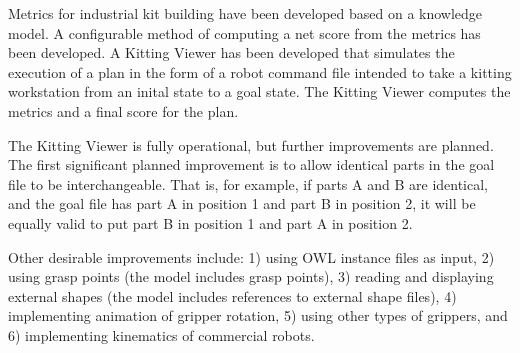 Metrics for industrial kit building have been developed based on a
knowledge model. A configurable method of computing a net score from the
metrics has been developed. A Kitting Viewer has been developed that
simulates the execution of a plan in the form of a robot command file
intended to take a kitting workstation from an inital state to a goal
state. The Kitting Viewer computes the metrics and a final score for the
plan.

The Kitting Viewer is fully operational, but further improvements are
planned. The first significant planned improvement is to allow identical
parts in the goal file to be interchangeable. That is, for example, if
parts A and B are identical, and the goal file has part A in position 1 and
part B in position 2, it will be equally valid to put part B in position 1
and part A in position 2.

Other desirable improvements include: 1) using OWL instance files as input, 2) using grasp points (the model includes grasp points), 3) reading and displaying external shapes (the model includes references to external shape files), 4) implementing animation of gripper rotation, 5) using other types of grippers, and 6) implementing kinematics of commercial robots.
% 
% 
% 
% 
% 
% 
% 
% 
